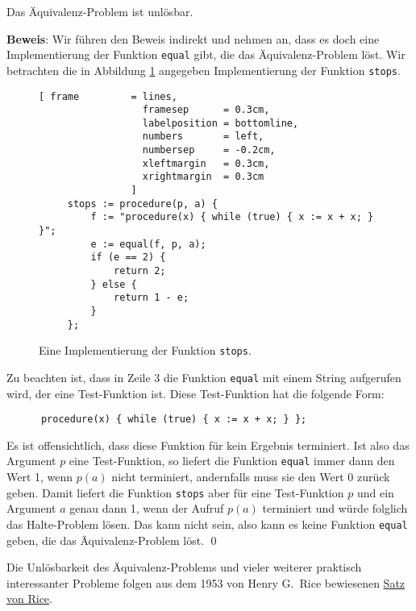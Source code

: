 \begin{Theorem}[Rice, 1953]
Das \"{A}quivalenz-Problem ist unl\"{o}sbar.  
\end{Theorem}

\noindent
\textbf{Beweis}:
Wir f\"{u}hren den Beweis indirekt und nehmen
an, dass es doch eine Implementierung der Funktion \texttt{equal} gibt, die das
\"{A}quivalenz-Problem l\"{o}st.  Wir betrachten die in Abbildung 
\ref{fig:stops} angegeben Implementierung der Funktion \texttt{stops}.


\begin{figure}[!h]
  \centering
\begin{Verbatim}[ frame         = lines, 
                  framesep      = 0.3cm, 
                  labelposition = bottomline,
                  numbers       = left,
                  numbersep     = -0.2cm,
                  xleftmargin   = 0.3cm,
                  xrightmargin  = 0.3cm
                ]
     stops := procedure(p, a) {
         f := "procedure(x) { while (true) { x := x + x; } }"; 
         e := equal(f, p, a);
         if (e == 2) {
             return 2;
         } else {
             return 1 - e;
         }
     };
\end{Verbatim}
  \vspace*{-0.3cm}
  \caption{Eine Implementierung der Funktion \texttt{stops}.}
  \label{fig:stops}
\end{figure}

Zu beachten ist, dass in Zeile 3 die Funktion \texttt{equal} mit einem String aufgerufen
wird, der eine Test-Funktion ist.  Diese 
Test-Funktion hat die
folgende Form:
\begin{verbatim}
      procedure(x) { while (true) { x := x + x; } };
\end{verbatim}
Es ist offensichtlich, dass diese Funktion f\"{u}r kein Ergebnis terminiert.
Ist also das Argument $p$ eine Test-Funktion, so liefert die Funktion
\texttt{equal} immer dann den Wert 1, 
wenn $p(a)$ nicht terminiert, andernfalls muss sie den Wert 0 zur\"{u}ck geben.
Damit liefert die Funktion \texttt{stops} aber f\"{u}r eine Test-Funktion $p$ 
und ein Argument 
$a$ genau dann 1, wenn der Aufruf $p(a)$ terminiert und w\"{u}rde folglich das Halte-Problem
l\"{o}sen.  Das kann nicht sein, also kann es keine Funktion  \texttt{equal}
geben, die das \"{A}quivalenz-Problem l\"{o}st. 
\qed
\vspace*{0.3cm}

\noindent
Die Unl\"{o}sbarkeit des \"{A}quivalenz-Problems und vieler weiterer praktisch interessanter
Probleme folgen aus dem 1953 von Henry G.~Rice \cite{rice:53} bewiesenen
\href{http://de.wikipedia.org/wiki/Satz_von_Rice}{Satz von Rice}.


